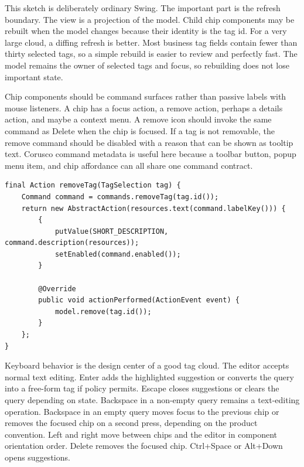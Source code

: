 This sketch is deliberately ordinary Swing. The important part is the refresh
boundary. The view is a projection of the model. Child chip components may be
rebuilt when the model changes because their identity is the tag id. For a very
large cloud, a diffing refresh is better. Most business tag fields contain fewer
than thirty selected tags, so a simple rebuild is easier to review and perfectly
fast. The model remains the owner of selected tags and focus, so rebuilding does
not lose important state.

Chip components should be command surfaces rather than passive labels with mouse
listeners. A chip has a focus action, a remove action, perhaps a details action,
and maybe a context menu. A remove icon should invoke the same command as Delete
when the chip is focused. If a tag is not removable, the remove command should be
disabled with a reason that can be shown as tooltip text. Corusco command
metadata is useful here because a toolbar button, popup menu item, and chip
affordance can all share one command contract.

\begin{lstlisting}[caption={A chip remove action carries the tag id and disabled reason.}]
final Action removeTag(TagSelection tag) {
    Command command = commands.removeTag(tag.id());
    return new AbstractAction(resources.text(command.labelKey())) {
        {
            putValue(SHORT_DESCRIPTION, command.description(resources));
            setEnabled(command.enabled());
        }

        @Override
        public void actionPerformed(ActionEvent event) {
            model.remove(tag.id());
        }
    };
}
\end{lstlisting}

Keyboard behavior is the design center of a good tag cloud. The editor accepts
normal text editing. Enter adds the highlighted suggestion or converts the query
into a free-form tag if policy permits. Escape closes suggestions or clears the
query depending on state. Backspace in a non-empty query remains a text-editing
operation. Backspace in an empty query moves focus to the previous chip or
removes the focused chip on a second press, depending on the product convention.
Left and right move between chips and the editor in component orientation order.
Delete removes the focused chip. Ctrl+Space or Alt+Down opens suggestions.


